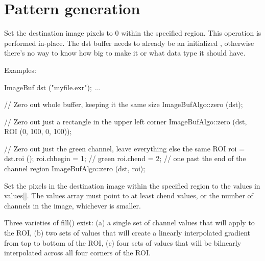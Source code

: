 \section{Pattern generation}
\label{sec:iba:patterns}

 
Set the destination image pixels to 0 within the specified region.
This operation is performed in-place.  The {\cf dst} buffer needs to
already be an initialized \ImageBuf, otherwise there's no way to know how
big to make it or what data type it should have.

\smallskip
\noindent Examples:
\begin{code}
    ImageBuf dst ("myfile.exr");
    ...

    // Zero out whole buffer, keeping it the same size
    ImageBufAlgo::zero (dst);

    // Zero out just a rectangle in the upper left corner
    ImageBufAlgo::zero (dst, ROI (0, 100, 0, 100));

    // Zero out just the green channel, leave everything else the same
    ROI roi = dst.roi ();
    roi.chbegin = 1; // green
    roi.chend = 2;   // one past the end of the channel region
    ImageBufAlgo::zero (dst, roi);
\end{code}
\apiend

 
Set the pixels in the destination image within the specified region
to the values in {\cf values[]}.  The {\cf
  values} array must point to at least {\cf chend} values, or the
number of channels in the image, whichever is smaller.

Three varieties of {\cf fill()} exist: (a) a single set of channel values that
will apply to the ROI, (b) two sets of values that will create a linearly
interpolated gradient from top to bottom of the ROI, (c) four sets of values
that will be bilnearly interpolated across all four corners of the ROI.

